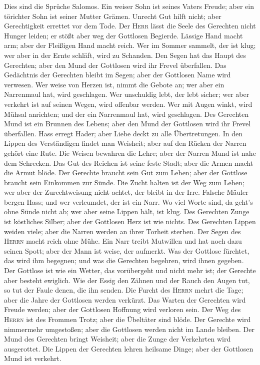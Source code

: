  Dies sind die Sprüche Salomos. Ein weiser Sohn ist seines
Vaters Freude; aber ein törichter Sohn ist seiner Mutter Grämen.
 Unrecht Gut hilft nicht; aber Gerechtigkeit errettet vor
dem Tode.  Der \textsc{Herr} lässt die Seele des Gerechten
nicht Hunger leiden; er stößt aber weg der Gottlosen Begierde.
 Lässige Hand macht arm; aber der Fleißigen Hand macht
reich.  Wer im Sommer sammelt, der ist klug; wer aber in
der Ernte schläft, wird zu Schanden.  Den Segen hat das
Haupt des Gerechten; aber den Mund der Gottlosen wird ihr Frevel
überfallen.  Das Gedächtnis der Gerechten bleibt im Segen;
aber der Gottlosen Name wird verwesen.  Wer weise von
Herzen ist, nimmt die Gebote an; wer aber ein Narrenmaul hat, wird
geschlagen.  Wer unschuldig lebt, der lebt sicher; wer
aber verkehrt ist auf seinen Wegen, wird offenbar werden.
 Wer mit Augen winkt, wird Mühsal anrichten; und der ein
Narrenmaul hat, wird geschlagen.  Des Gerechten Mund ist
ein Brunnen des Lebens; aber den Mund der Gottlosen wird ihr Frevel
überfallen.  Hass erregt Hader; aber Liebe deckt zu alle
Übertretungen.  In den Lippen des Verständigen findet man
Weisheit; aber auf den Rücken der Narren gehört eine Rute.
 Die Weisen bewahren die Lehre; aber der Narren Mund ist
nahe dem Schrecken.  Das Gut des Reichen ist seine feste
Stadt; aber die Armen macht die Armut blöde.  Der
Gerechte braucht sein Gut zum Leben; aber der Gottlose braucht sein
Einkommen zur Sünde.  Die Zucht halten ist der Weg zum
Leben; wer aber der Zurechtweisung nicht achtet, der bleibt in der Irre.
 Falsche Mäuler bergen Hass; und wer verleumdet, der ist
ein Narr.  Wo viel Worte sind, da geht's ohne Sünde nicht
ab; wer aber seine Lippen hält, ist klug.  Des Gerechten
Zunge ist köstliches Silber; aber der Gottlosen Herz ist wie nichts.
 Des Gerechten Lippen weiden viele; aber die Narren
werden an ihrer Torheit sterben.  Der Segen des
\textsc{Herrn} macht reich ohne Mühe.  Ein Narr treibt
Mutwillen und hat noch dazu seinen Spott; aber der Mann ist weise, der
aufmerkt.  Was der Gottlose fürchtet, das wird ihm
begegnen; und was die Gerechten begehren, wird ihnen gegeben.
 Der Gottlose ist wie ein Wetter, das vorübergeht und
nicht mehr ist; der Gerechte aber besteht ewiglich.  Wie
der Essig den Zähnen und der Rauch den Augen tut, so tut der Faule
denen, die ihn senden.  Die Furcht des \textsc{Herrn}
mehrt die Tage; aber die Jahre der Gottlosen werden verkürzt.
 Das Warten der Gerechten wird Freude werden; aber der
Gottlosen Hoffnung wird verloren sein.  Der Weg des
\textsc{Herrn} ist des Frommen Trotz; aber die Übeltäter sind blöde.
 Der Gerechte wird nimmermehr umgestoßen; aber die
Gottlosen werden nicht im Lande bleiben.  Der Mund des
Gerechten bringt Weisheit; aber die Zunge der Verkehrten wird
ausgerottet.  Die Lippen der Gerechten lehren heilsame
Dinge; aber der Gottlosen Mund ist verkehrt.

